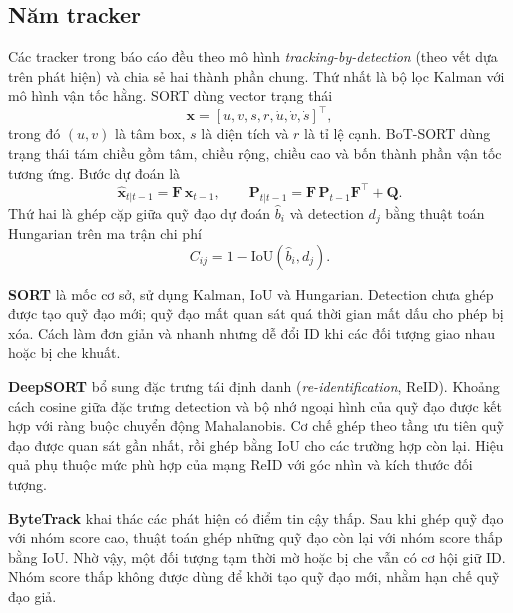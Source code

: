 \documentclass[fontsize=13pt,a4paper,oneside,parskip=false,numbers=noenddot,bibliography=totoc]{scrreprt}
\begin{document}
\subsection{Năm tracker}
\label{sec:tracker}

Các tracker trong báo cáo đều theo mô hình \textit{tracking-by-detection} (theo vết dựa trên phát hiện) và chia sẻ hai thành phần chung. Thứ nhất là bộ lọc Kalman \cite{kalman1960} với mô hình vận tốc hằng. SORT dùng vector trạng thái
\begin{equation}
  \mathbf{x} = [u, v, s, r, \dot u, \dot v, \dot s]^\top,
  \label{eq:state-sort}
\end{equation}
trong đó $(u,v)$ là tâm box, $s$ là diện tích và $r$ là tỉ lệ cạnh. BoT-SORT dùng trạng thái tám chiều gồm tâm, chiều rộng, chiều cao và bốn thành phần vận tốc tương ứng. Bước dự đoán là
\begin{equation}
  \hat{\mathbf{x}}_{t|t-1} = \mathbf{F}\,\mathbf{x}_{t-1}, \qquad
  \mathbf{P}_{t|t-1} = \mathbf{F}\,\mathbf{P}_{t-1}\mathbf{F}^\top + \mathbf{Q}.
  \label{eq:kalman}
\end{equation}
Thứ hai là ghép cặp giữa quỹ đạo dự đoán $\hat b_i$ và detection $d_j$ bằng thuật toán Hungarian \cite{kuhn1955} trên ma trận chi phí
\begin{equation}
  C_{ij} = 1 - \mathrm{IoU}(\hat b_i, d_j).
  \label{eq:iou-cost}
\end{equation}

\textbf{SORT} \cite{bewley2016sort} là mốc cơ sở, sử dụng Kalman, IoU và Hungarian. Detection chưa ghép được tạo quỹ đạo mới; quỹ đạo mất quan sát quá thời gian mất dấu cho phép bị xóa. Cách làm đơn giản và nhanh nhưng dễ đổi ID khi các đối tượng giao nhau hoặc bị che khuất.

\textbf{DeepSORT} \cite{wojke2017deepsort} bổ sung đặc trưng tái định danh (\textit{re-identification}, ReID). Khoảng cách cosine giữa đặc trưng detection và bộ nhớ ngoại hình của quỹ đạo được kết hợp với ràng buộc chuyển động Mahalanobis. Cơ chế ghép theo tầng ưu tiên quỹ đạo được quan sát gần nhất, rồi ghép bằng IoU cho các trường hợp còn lại. Hiệu quả phụ thuộc mức phù hợp của mạng ReID với góc nhìn và kích thước đối tượng.

\textbf{ByteTrack} \cite{zhang2022bytetrack} khai thác các phát hiện có điểm tin cậy thấp. Sau khi ghép quỹ đạo với nhóm score cao, thuật toán ghép những quỹ đạo còn lại với nhóm score thấp bằng IoU. Nhờ vậy, một đối tượng tạm thời mờ hoặc bị che vẫn có cơ hội giữ ID. Nhóm score thấp không được dùng để khởi tạo quỹ đạo mới, nhằm hạn chế quỹ đạo giả.
\end{document}
